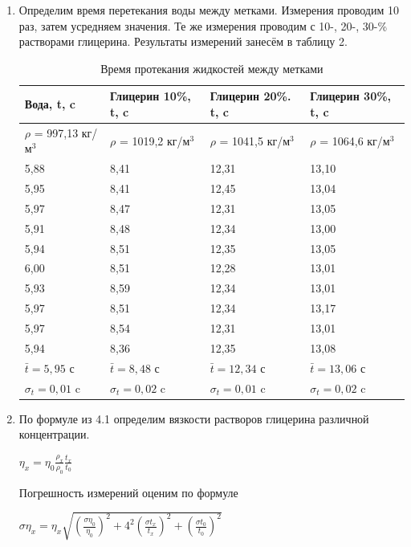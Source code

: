 \documentclass[a4paper]{article}
\begin{document}
\begin{enumerate}
    \item Определим время перетекания воды между метками. Измерения проводим 10 раз, затем усредняем значения. Те же измерения проводим с 10-, 20-, 30-\% растворами глицерина. Результаты измерений занесём в таблицу 2.

    \begin{table}[h]
    \centering
    \begin{center}
    \caption{Время протекания жидкостей между метками}
    \end{center}
    \vspace{0.05cm}
    \label{tab:my_label}
    \begin{tabular}{ |p{3cm}|p{3cm}|p{3cm}|p{3cm}| }
    \hline
     Вода, t, c & Глицерин 10\%, t, c & Глицерин 20\%. t, c & Глицерин 30\%, t, c \\ 
    \hline
    $\rho$ = 997,13 кг/м$^3$ & $\rho$ = 1019,2 кг/м$^3$ & $\rho$ = 1041,5 кг/м$^3$ & $\rho$ = 1064,6 кг/м$^3$\\
    \hline
    5,88 & 8,41 & 12,31 & 13,10\\
    5,95 & 8,41 & 12,45 & 13,04\\
    5,97 & 8,47 & 12,31 & 13,05\\
    5,91 & 8,48 & 12,34 & 13,00\\
    5,94 & 8,51 & 12,35 & 13,05\\
    6,00 & 8,51 & 12,28 & 13,01\\
    5,93 & 8,59 & 12,34 & 13,01\\
    5,97 & 8,51 & 12,34 & 13,17\\
    5,97 & 8,54 & 12,31 & 13,01\\
    5,94 & 8,36 & 12,35 & 13,08\\
    
    \hline
    \hline
    
    $\bar t = 5,95$ с & $\bar t = 8,48$ с & $\bar t = 12,34$ с & $\bar t = 13,06$ с \\
    \hline
    $\sigma_t = 0,01$ c & $\sigma_t = 0,02$ c & $\sigma_t = 0,01$ c & $\sigma_t = 0,02$ c \\
    \hline
    \end{tabular}
    \end{table}  
    
    \item По формуле из 4.1 определим вязкости растворов глицерина различной концентрации. 
    \begin{center}
    $\eta_x = \eta_0\frac{\rho_x}{\rho_0}\frac{t_x}{t_0}$
    \end{center}
    Погрешность измерений оценим по формуле
    \begin{center}
     $\sigma \eta_x = \eta_x \sqrt{(\frac{\sigma \eta_0}{\eta_0})^2 + 4^2(\frac{\sigma t_x}{t_x})^2 + (\frac{\sigma t_0}{t_0})^2}$
    \end{center}
    

\end{enumerate}
\end{document}
